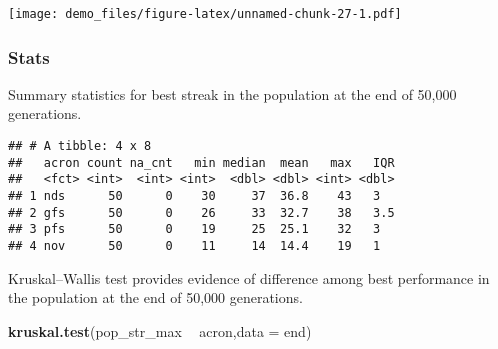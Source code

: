 \documentclass[]{book}
\newenvironment{Shaded}{\begin{snugshade}}{\end{snugshade}}
\newcommand{\DataTypeTok}[1]{\textcolor[rgb]{0.13,0.29,0.53}{#1}}
\newcommand{\KeywordTok}[1]{\textcolor[rgb]{0.13,0.29,0.53}{\textbf{#1}}}
\newcommand{\NormalTok}[1]{#1}
\newcommand{\OperatorTok}[1]{\textcolor[rgb]{0.81,0.36,0.00}{\textbf{#1}}}
\newcommand{\OtherTok}[1]{\textcolor[rgb]{0.56,0.35,0.01}{#1}}
\newcommand{\StringTok}[1]{\textcolor[rgb]{0.31,0.60,0.02}{#1}}
\begin{document}
\texttt{[image: demo\_files/figure-latex/unnamed-chunk-27-1.pdf]}

\hypertarget{stats-4}{%
\subsubsection{Stats}\label{stats-4}}

Summary statistics for best streak in the population at the end of 50,000 generations.

\begin{Shaded}
\end{Shaded}

\begin{verbatim}
## # A tibble: 4 x 8
##   acron count na_cnt   min median  mean   max   IQR
##   <fct> <int>  <int> <int>  <dbl> <dbl> <int> <dbl>
## 1 nds      50      0    30     37  36.8    43   3  
## 2 gfs      50      0    26     33  32.7    38   3.5
## 3 pfs      50      0    19     25  25.1    32   3  
## 4 nov      50      0    11     14  14.4    19   1
\end{verbatim}

Kruskal--Wallis test provides evidence of difference among best performance in the population at the end of 50,000 generations.

\begin{Shaded}
\begin{Highlighting}[]
\KeywordTok{kruskal.test}\NormalTok{(pop_str_max }\OperatorTok{~}\StringTok{ }\NormalTok{acron,}\DataTypeTok{data =}\NormalTok{ end)}
\end{Highlighting}
\end{Shaded}
\end{document}
